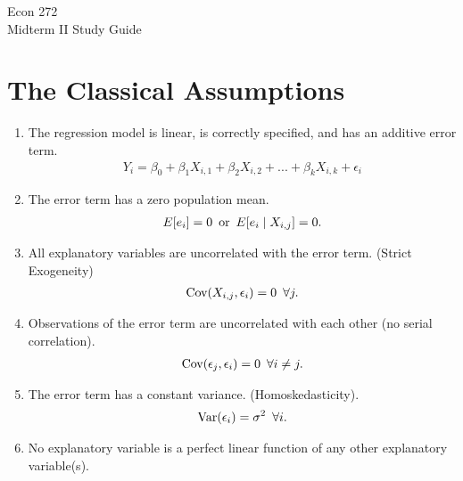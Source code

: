 \documentclass[11pt,twoside,openany]{memoir}
\begin{document}
\begin{center}
{\large Econ 272 \\[0.1in]Midterm II Study Guide \\[0.1in]}
\end{center}
\vspace{4pt}
    \section*{The Classical Assumptions}
        \begin{enumerate}[label = \Roman*,itemsep=1pt,topsep=3pt]
            \item The regression model is linear, is correctly specified, and has an additive error term.
                \begin{equation*}
                \begin{split}
                    Y_i = \beta_0 + \beta_1 X_{i,1} + \beta_2 X_{i,2} + ... + \beta_k X_{i,k} + \epsilon_i
                \end{split}
                \end{equation*}
            \item The error term has a zero population mean.
                \begin{equation*}
                \begin{split}
                    E[e_i] = 0 \h5\text{or}\h5 E[e_i \mid X_{i,j}] = 0.
                \end{split}
                \end{equation*}
            \item All explanatory variables are uncorrelated with the error term. (Strict Exogeneity)
                \begin{equation*}
                \begin{split}
                    \text{Cov}(X_{i,j},\epsilon_i) = 0 \h5\forall j.
                \end{split}
                \end{equation*}
            \item Observations of the error term are uncorrelated with each other (no serial correlation).
                \begin{equation*}
                \begin{split}
                    \text{Cov}(\epsilon_j,\epsilon_i) = 0 \h5\forall i\neq j.
                \end{split}
                \end{equation*}
            \item The error term has a constant variance. (Homoskedasticity).
                \begin{equation*}
                \begin{split}
                    \text{Var}(\epsilon_i) = \sigma ^2 \h5\forall i.
                \end{split}
                \end{equation*}
            \item No explanatory variable is a perfect linear function of any other explanatory variable(s).
        \end{enumerate}
\end{document}
